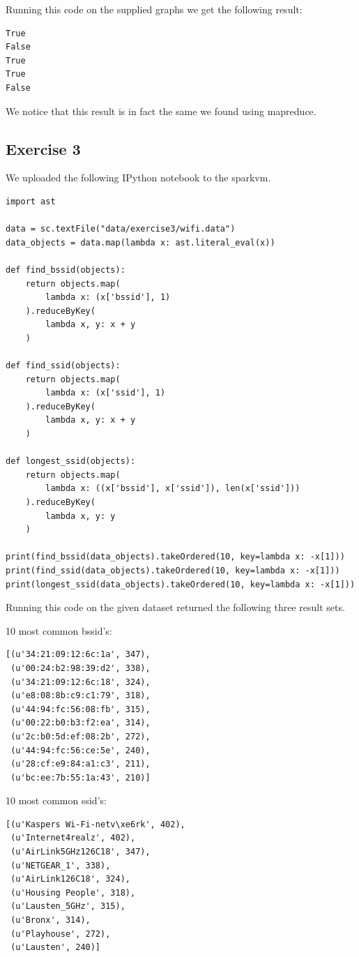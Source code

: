 \documentclass{article}
\begin{document}
Running this code on the supplied graphs we get the following result:

\begin{lstlisting}
True
False
True
True
False
\end{lstlisting}

We notice that this result is in fact the same we found using mapreduce.

\subsection{Exercise 3}
\label{sub:Exercise 3}

We uploaded the following IPython notebook to the sparkvm.

\begin{lstlisting}
import ast

data = sc.textFile("data/exercise3/wifi.data")
data_objects = data.map(lambda x: ast.literal_eval(x))

def find_bssid(objects):
    return objects.map(
        lambda x: (x['bssid'], 1)
    ).reduceByKey(
        lambda x, y: x + y
    )

def find_ssid(objects):
    return objects.map(
        lambda x: (x['ssid'], 1)
    ).reduceByKey(
        lambda x, y: x + y
    )

def longest_ssid(objects):
    return objects.map(
        lambda x: ((x['bssid'], x['ssid']), len(x['ssid']))
    ).reduceByKey(
        lambda x, y: y
    )

print(find_bssid(data_objects).takeOrdered(10, key=lambda x: -x[1]))
print(find_ssid(data_objects).takeOrdered(10, key=lambda x: -x[1]))
print(longest_ssid(data_objects).takeOrdered(10, key=lambda x: -x[1]))
\end{lstlisting}

Running this code on the given dataset returned the following three result sets.

10 most common bssid's:

\begin{lstlisting}
[(u'34:21:09:12:6c:1a', 347),
 (u'00:24:b2:98:39:d2', 338),
 (u'34:21:09:12:6c:18', 324),
 (u'e8:08:8b:c9:c1:79', 318),
 (u'44:94:fc:56:08:fb', 315),
 (u'00:22:b0:b3:f2:ea', 314),
 (u'2c:b0:5d:ef:08:2b', 272),
 (u'44:94:fc:56:ce:5e', 240),
 (u'28:cf:e9:84:a1:c3', 211),
 (u'bc:ee:7b:55:1a:43', 210)]
\end{lstlisting}

10 most common ssid's:

\begin{lstlisting}
[(u'Kaspers Wi-Fi-netv\xe6rk', 402),
 (u'Internet4realz', 402),
 (u'AirLink5GHz126C18', 347),
 (u'NETGEAR_1', 338),
 (u'AirLink126C18', 324),
 (u'Housing People', 318),
 (u'Lausten_5GHz', 315),
 (u'Bronx', 314),
 (u'Playhouse', 272),
 (u'Lausten', 240)]
\end{lstlisting}
\end{document}
